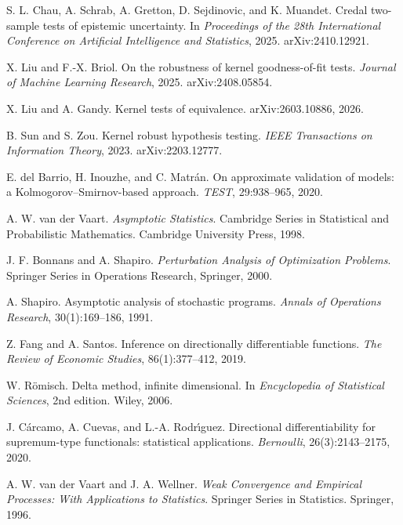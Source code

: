 S. L. Chau, A. Schrab, A. Gretton, D. Sejdinovic, and K. Muandet.
\newblock Credal two-sample tests of epistemic uncertainty.
\newblock In \emph{Proceedings of the 28th International Conference on Artificial Intelligence and Statistics}, 2025. arXiv:2410.12921.

X. Liu and F.-X. Briol.
\newblock On the robustness of kernel goodness-of-fit tests.
\newblock \emph{Journal of Machine Learning Research}, 2025. arXiv:2408.05854.

X. Liu and A. Gandy.
\newblock Kernel tests of equivalence.
\newblock arXiv:2603.10886, 2026.

B. Sun and S. Zou.
\newblock Kernel robust hypothesis testing.
\newblock \emph{IEEE Transactions on Information Theory}, 2023. arXiv:2203.12777.

E. del Barrio, H. Inouzhe, and C. Matr\'an.
\newblock On approximate validation of models: a Kolmogorov--Smirnov-based approach.
\newblock \emph{TEST}, 29:938--965, 2020.

A. W. van der Vaart.
\newblock \emph{Asymptotic Statistics}.
\newblock Cambridge Series in Statistical and Probabilistic Mathematics. Cambridge University Press, 1998.

J. F. Bonnans and A. Shapiro.
\newblock \emph{Perturbation Analysis of Optimization Problems}.
\newblock Springer Series in Operations Research, Springer, 2000.

A. Shapiro.
\newblock Asymptotic analysis of stochastic programs.
\newblock \emph{Annals of Operations Research}, 30(1):169--186, 1991.

Z. Fang and A. Santos.
\newblock Inference on directionally differentiable functions.
\newblock \emph{The Review of Economic Studies}, 86(1):377--412, 2019.

W. R{\"o}misch.
\newblock Delta method, infinite dimensional.
\newblock In \emph{Encyclopedia of Statistical Sciences}, 2nd edition. Wiley, 2006.

J. C{\'a}rcamo, A. Cuevas, and L.-A. Rodr{\'\i}guez.
\newblock Directional differentiability for supremum-type functionals: statistical applications.
\newblock \emph{Bernoulli}, 26(3):2143--2175, 2020.

A. W. van der Vaart and J. A. Wellner.
\newblock \emph{Weak Convergence and Empirical Processes: With Applications to Statistics}.
\newblock Springer Series in Statistics. Springer, 1996.

